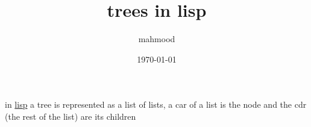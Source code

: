 \documentclass[a4paper,12pt]{article}
\author{mahmood}
\date{\today}
\title{trees in lisp}
\begin{document}
\maketitle
in \href{20230215220838-lisp.org}{lisp} a tree is represented as a list of lists, a car of a list is the node and the cdr (the rest of the list) are its children
\end{document}
